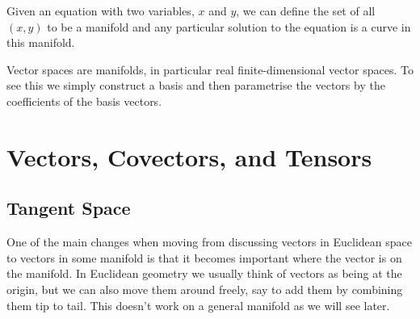 \documentclass[fleqn]{NotesClass}
\begin{document}
    Given an equation with two variables, \(x\) and \(y\), we can define the set of all \((x, y)\) to be a manifold and any particular solution to the equation is a curve in this manifold.
    
    Vector spaces are manifolds, in particular real finite-dimensional vector spaces.
    To see this we simply construct a basis and then parametrise the vectors by the coefficients of the basis vectors.
    
    \section{Vectors, Covectors, and Tensors}
    \subsection{Tangent Space}
    One of the main changes when moving from discussing vectors in Euclidean space to vectors in some manifold is that it becomes important where the vector is on the manifold.
    In Euclidean geometry we usually think of vectors as being at the origin, but we can also move them around freely, say to add them by combining them tip to tail.
    This doesn't work on a general manifold as we will see later.
    
\end{document}
